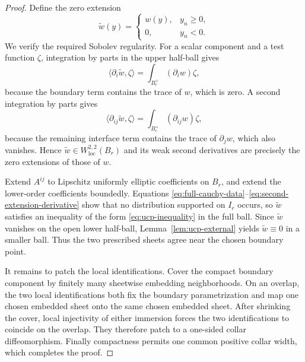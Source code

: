 \documentclass[11pt,a4paper]{article}
\numberwithin{equation}{section}
\begin{document}
\begin{proof}
Define the zero extension
\begin{equation}
        \widetilde w(y)=
        \begin{cases}
        w(y),&y_n\ge0,\\
        0,&y_n<0.
        \end{cases}
\end{equation}
We verify the required Sobolev regularity.  For a scalar component and a test
function $\zeta$, integration by parts in the upper half-ball gives
\begin{equation}
        \langle\partial_i\widetilde w,\zeta\rangle
        =\int_{B_r^+}(\partial_iw)\zeta,
\end{equation}
because the boundary term contains the trace of $w$, which is zero.  A second
integration by parts gives
\begin{equation}\label{eq:second-extension-derivative}
        \langle\partial_{ij}\widetilde w,\zeta\rangle
        =\int_{B_r^+}(\partial_{ij}w)\zeta,
\end{equation}
because the remaining interface term contains the trace of $\partial_jw$,
which also vanishes.  Hence $\widetilde w\in W^{2,2}_{\mathrm{loc}}(B_r)$ and
its weak second derivatives are precisely the zero extensions of those of
$w$.

Extend $A^{ij}$ to Lipschitz uniformly elliptic coefficients on $B_r$, and
extend the lower-order coefficients boundedly.  Equations
\eqref{eq:full-cauchy-data}--\eqref{eq:second-extension-derivative} show that
no distribution supported on $I_r$ occurs, so $\widetilde w$ satisfies an
inequality of the form \eqref{eq:ucp-inequality} in the full ball.  Since
$\widetilde w$ vanishes on the open lower half-ball,
Lemma~\ref{lem:ucp-external} yields $\widetilde w\equiv0$ in a smaller ball.
Thus the two prescribed sheets agree near the chosen boundary point.

It remains to patch the local identifications.  Cover the compact boundary
component by finitely many sheetwise embedding neighborhoods.  On an overlap,
the two local identifications both fix the boundary parametrization and map
one chosen embedded sheet onto the same chosen embedded sheet.  After
shrinking the cover, local injectivity of either immersion forces the two
identifications to coincide on the overlap.  They therefore patch to a
one-sided collar diffeomorphism.  Finally compactness permits one common positive
collar width, which completes the proof.
\end{proof}
\end{document}
